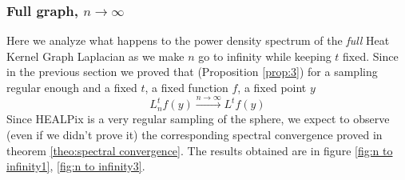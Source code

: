 \subsubsection{Full graph, $n\to\infty$}\label{sec:Chapter1: n to infty}
Here we analyze what happens to the power density spectrum of the \textit{full} Heat Kernel Graph Laplacian as we make $n$ go to infinity while keeping $t$ fixed. Since in the previous section we proved that (Proposition \ref{prop:3}) for a sampling regular enough and a fixed $t$, a fixed function $f$, a fixed point $y$
$$L_n^tf(y)\xrightarrow{n\to\infty}L^tf(y)$$
Since HEALPix is a very regular sampling of the sphere, we expect to observe (even if we didn't prove it) the corresponding spectral convergence proved in theorem \ref{theo:spectral convergence}. The results obtained are in figure \ref{fig:n to infinity1}, \ref{fig:n to infinity3}.

